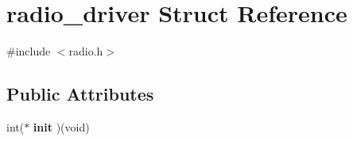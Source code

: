 \hypertarget{structradio__driver}{}\section{radio\+\_\+driver Struct Reference}
\label{structradio__driver}


{\ttfamily \#include $<$radio.\+h$>$}

\subsection*{Public Attributes}
\begin{DoxyCompactItemize}
\item 
\hypertarget{structradio__driver_a2cbd88d29724af727d0cfe82fff332d0}{}int($\ast$ {\bfseries init} )(void)\label{structradio__driver_a2cbd88d29724af727d0cfe82fff332d0}


\end{DoxyCompactItemize}

